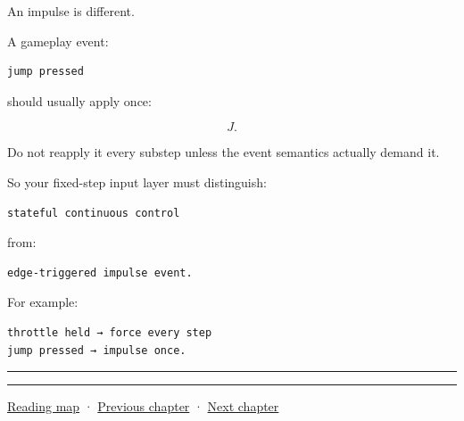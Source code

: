 An impulse is different.

A gameplay event:

\begin{verbatim}
jump pressed
\end{verbatim}

should usually apply once:

\[
J.
\]

Do not reapply it every substep unless the event semantics actually demand it.

So your fixed-step input layer must distinguish:

\begin{verbatim}
stateful continuous control
\end{verbatim}

from:

\begin{verbatim}
edge-triggered impulse event.
\end{verbatim}

For example:

\begin{verbatim}
throttle held → force every step
jump pressed → impulse once.
\end{verbatim}

\begin{center}\rule{0.5\linewidth}{0.5pt}\end{center}

\begin{center}\rule{0.5\linewidth}{0.5pt}\end{center}

\href{Chapter\%20Edition/03\%20-\%20Game\%20Engine/00\%20-\%20Reading\%20Map}{Reading map} · \hyperref[06-engine-ii-ch036]{Previous chapter} · \hyperref[06-engine-ii-ch038]{Next chapter}

